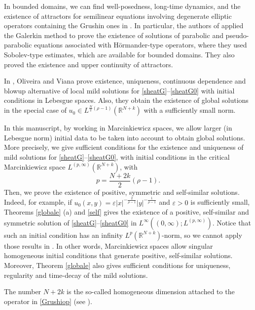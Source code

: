 \documentclass[12pt]{amsart}
\newcommand{\R}{\mathbb{R}}
\begin{document}
In bounded domains, we can find well-posedness, long-time dynamics, and the existence of attractors for semilinear equations involving degenerate elliptic operators containing the Grushin ones in \cite{Kogoj-Sonner-13,Kogoj-Sonner-14,Liu-Tian-24}. In particular, the authors of \cite{Liu-Tian-24} applied the Galerkin method to prove the existence of solutions of parabolic and pseudo-parabolic equations associated with Hörmander-type operators, where they used Sobolev-type estimates, which are available for bounded domains. They also proved the existence and upper continuity of attractors.


In \cite{Oli-Vi-23}, Oliveira and Viana prove existence, uniqueness, continuous dependence and blowup alternative of local mild solutions for \eqref{sheatG}--\eqref{sheatG0} with initial conditions in Lebesgue spaces. Also, they obtain the existence of global solutions in the special case of $u_0\in L^{\frac{ N}{2}(\rho-1)}(\R^{N+k})$ with a sufficiently small norm. 

%
In this manuscript, by working in Marcinkiewicz spaces, we allow larger (in Lebesgue norm) initial data to be taken into account to obtain global solutions. More precisely, we give sufficient conditions for the existence and uniqueness of mild solutions for \eqref{sheatG}--\eqref{sheatG0}, with initial conditions in the critical Marcinkiewicz space $L^{(p,\infty)}(\R^{N+k})$, with 
\begin{equation}\label{p}
	p = \frac{N+2k}{2}(\rho-1) .
\end{equation}
Then, we prove the existence of positive, symmetric and self-similar solutions. Indeed, for example, if $u_0(x,y) = \varepsilon|x|^{-\frac{2}{\rho-1}} |y|^{-\frac{1}{\rho-1}}$ and $\varepsilon>0$ is sufficiently small, Theorems \ref{globale} (a) and \ref{self} gives the existence of a positive, self-similar and symmetric solution of \eqref{sheatG}--\eqref{sheatG0} in $L^\infty((0,\infty);L^{(p,\infty)})$. Notice that such an initial condition has an infinity $L^p(\R^{N+k})$-norm, so we cannot apply those results in \cite{Oli-Vi-23}. In other words, Marcinkiewicz spaces allow singular homogeneous initial conditions that generate positive, self-similar solutions. Moreover, Theorem \ref{globale} also gives sufficient conditions for uniqueness, regularity and time-decay of the mild solutions.

The number $N+2k$ is the so-called homogeneous dimension attached to the operator in \eqref{Grushiop}  (see \cite{Kogoj-Lan-18}). 
\end{document}
